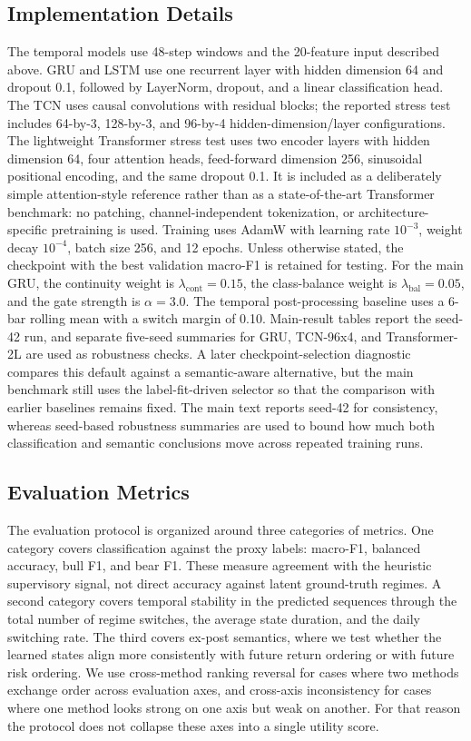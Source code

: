 \documentclass[a4paper,fleqn]{cas-dc}
\begin{document}
\subsection{Implementation Details}
The temporal models use 48-step windows and the 20-feature input described above. GRU and LSTM use one recurrent layer with hidden dimension 64 and dropout 0.1, followed by LayerNorm, dropout, and a linear classification head. The TCN uses causal convolutions with residual blocks; the reported stress test includes 64-by-3, 128-by-3, and 96-by-4 hidden-dimension/layer configurations. The lightweight Transformer stress test uses two encoder layers with hidden dimension 64, four attention heads, feed-forward dimension 256, sinusoidal positional encoding, and the same dropout 0.1. It is included as a deliberately simple attention-style reference rather than as a state-of-the-art Transformer benchmark: no patching, channel-independent tokenization, or architecture-specific pretraining is used. Training uses AdamW with learning rate $10^{-3}$, weight decay $10^{-4}$, batch size 256, and 12 epochs. Unless otherwise stated, the checkpoint with the best validation macro-F1 is retained for testing. For the main GRU, the continuity weight is $\lambda_{\mathrm{cont}}=0.15$, the class-balance weight is $\lambda_{\mathrm{bal}}=0.05$, and the gate strength is $\alpha=3.0$. The temporal post-processing baseline uses a 6-bar rolling mean with a switch margin of 0.10. Main-result tables report the seed-42 run, and separate five-seed summaries for GRU, TCN-96x4, and Transformer-2L are used as robustness checks. A later checkpoint-selection diagnostic compares this default against a semantic-aware alternative, but the main benchmark still uses the label-fit-driven selector so that the comparison with earlier baselines remains fixed. The main text reports seed-42 for consistency, whereas seed-based robustness summaries are used to bound how much both classification and semantic conclusions move across repeated training runs.

\subsection{Evaluation Metrics}
The evaluation protocol is organized around three categories of metrics. One category covers classification against the proxy labels: macro-F1, balanced accuracy, bull F1, and bear F1. These measure agreement with the heuristic supervisory signal, not direct accuracy against latent ground-truth regimes. A second category covers temporal stability in the predicted sequences through the total number of regime switches, the average state duration, and the daily switching rate. The third covers ex-post semantics, where we test whether the learned states align more consistently with future return ordering or with future risk ordering. We use cross-method ranking reversal for cases where two methods exchange order across evaluation axes, and cross-axis inconsistency for cases where one method looks strong on one axis but weak on another. For that reason the protocol does not collapse these axes into a single utility score.
\end{document}
